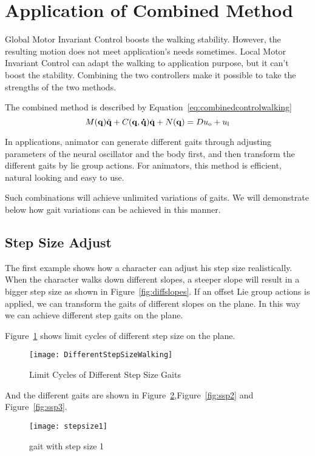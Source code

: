 \section{Application of Combined Method}
Global Motor Invariant Control boosts the walking stability.
However,  the resulting motion does not meet application's needs sometimes.
Local Motor Invariant Control can adapt the walking to application purpose, but it can't boost the stability.
Combining the two controllers make it possible to take the strengths of the two methods.

The combined method is described by Equation~\ref{eq:combinedcontrolwalking}
\begin{equation}
\label{eq:combinedcontrolwalking}
M(\mathbf{q}) \ddot{\mathbf{q}} + C(\mathbf{q,\dot{q}})\dot{\mathbf{q}} + N(\mathbf{q}) = Du_{\mathrm{o}}+u_{\mathrm{l}}
\end{equation}

In applications, animator can generate different gaits through  adjusting  parameters of the neural oscillator and the body first, and then transform the different gaits by lie group actions.
For animators, this method is efficient, natural looking and easy to use.

Such combinations will achieve unlimited variations of gaits.
We will demonstrate below how gait variations can be achieved in this manner.

\subsection{Step Size Adjust}
The first example shows how a character can adjust his step size realistically.
When the character walks down different slopes, a steeper slope will result in a bigger step size as shown in Figure~\ref{fig:diffslopes}. 
If an offset Lie group actions is applied, we can transform the gaits of different slopes on the plane.
In this way we can achieve different step gaits on the plane.

Figure~\ref{fig:differentstepsizeonplaine} shows limit cycles of different step size on the plane.
\begin{figure}[!htbp]
  \begin{center}
      \texttt{[image: DifferentStepSizeWalking]}
    \caption{Limit Cycles of Different Step Size Gaits}
    \label{fig:differentstepsizeonplaine}
\end{center}
\end{figure}


And the different gaits are shown in Figure~\ref{fig:ssp1},Figure~\ref{fig:ssp2} and Figure~\ref{fig:ssp3}.
\begin{figure}[!htbp]
  \begin{center}
      \texttt{[image: stepsize1]}
    \caption{gait with step size 1}
    \label{fig:ssp1}
\end{center}
\end{figure}

